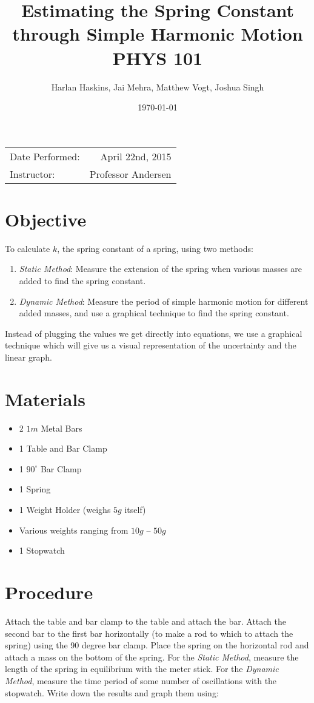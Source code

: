 \documentclass{article}
\title{Estimating the Spring Constant \\ through Simple Harmonic Motion \\ PHYS 101}
\author{Harlan Haskins, Jai Mehra, Matthew Vogt, Joshua Singh}
\date{\today}
\begin{document}
\maketitle

\begin{center}
\begin{tabular}{l r}
Date Performed: & April 22nd, 2015 \\
Instructor: & Professor Andersen
\end{tabular}
\end{center}

\pagebreak

\section{Objective}

To calculate $k$, the spring constant of a spring, using two methods:
\begin{enumerate}
	\item \emph{Static Method}: Measure the extension of the spring when various masses are added to find the spring constant.
	\item \emph{Dynamic Method}: Measure the period of simple harmonic motion for different added masses, and use a graphical technique to find the spring constant.
\end{enumerate}
Instead of plugging the values we get directly into equations, we use a graphical technique which will give us a visual representation of the uncertainty and the linear graph.
\begin{center}\end{center}

\section{Materials}
\begin{itemize}
	\item 2 $1m$ Metal Bars
	\item 1 Table and Bar Clamp
	\item 1 $90^{\circ}$ Bar Clamp
	\item 1 Spring
	\item 1 Weight Holder (weighs $5g$ itself)
	\item Various weights ranging from $10g$ – $50g$
	\item 1 Stopwatch
\end{itemize}

\section{Procedure}
Attach the table and bar clamp to the table and attach the bar. Attach the second bar to the first bar horizontally (to make a rod to which to attach the spring) using the 90 degree bar clamp. Place the spring on the horizontal rod and attach a mass on the bottom of the spring. For the \emph{Static Method}, measure the length of the spring in equilibrium with the meter stick. For the \emph{Dynamic Method}, measure the time period of some number of oscillations with the stopwatch. Write down the results and graph them using:
\end{document}
